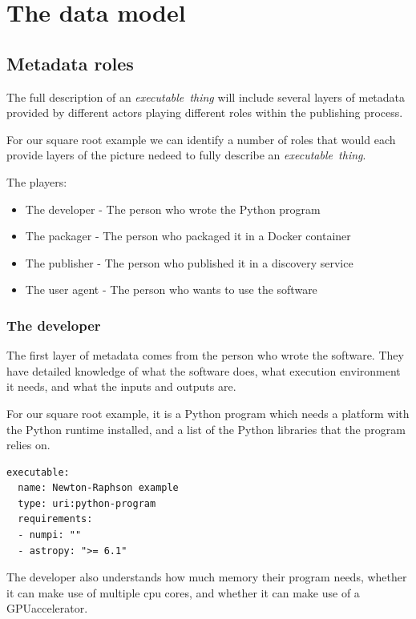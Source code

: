 \documentclass[11pt,a4paper]{ivoa}
\newcommand{\executablething}[1] {\textit{executable~thing#1}}
\newcommand{\python} {Python}
\newcommand{\pythonprogram} {Python program}
\newcommand{\dockercontainer} {Docker container}
\newcommand{\gpu}[1] {GPU#1}
\begin{document}
\section{The data model}
\label{data-model}

\subsection{Metadata roles}
\label{metadata-roles}

The full description of an \executablething{} will include several layers of metadata
provided by different actors playing different roles within the publishing process.

For our square root example we can identify a number of roles that would each provide
layers of the picture nedeed to fully describe an \executablething{}.

The players:
\begin{itemize}
    \item The developer  - The person who wrote the \pythonprogram{}
    \item The packager   - The person who packaged it in a \dockercontainer{}
    \item The publisher  - The person who published it in a discovery service
    \item The user agent - The person who wants to use the software
\end{itemize}

\subsubsection{The developer}
\label{software-developer}

The first layer of metadata comes from the person who wrote the software.
They have detailed knowledge of what the software does, what execution environment it needs,
and what the inputs and outputs are.

For our square root example, it is a \pythonprogram{} which needs a platform with the \python{} runtime installed,
and a list of the \python{} libraries that the program relies on.

\begin{lstlisting}[]
executable:
  name: Newton-Raphson example
  type: uri:python-program
  requirements:
  - numpi: ""
  - astropy: ">= 6.1"
\end{lstlisting}

The developer also understands how much memory their program needs, whether it can make use of multiple cpu cores,
and whether it can make use of a \gpu accelerator.
\end{document}
